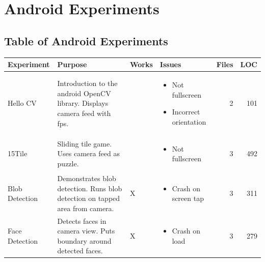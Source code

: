 \appendix




\clearpage
\section{Android Experiments}\label{app:android_experiments}
	\subsection{Table of Android Experiments}
	\begin{table}[h!]
		\centering
		\label{tab:android_experiments}
		\begin{tabular}{|l|p{}|l|p{}|r|r|}
			\hline
			\rowcolor{gray!50}
			\bfseries Experiment&\bfseries Purpose&\bfseries Works&\bfseries Issues&\bfseries Files&\bfseries LOC\\
			\hline
			Hello CV&
			Introduction to the android OpenCV library. Displays camera feed with fps.&
			\checkmark&
			\begin{itemize}[noitemsep,topsep=0pt,parsep=0pt]
				\item{Not fullscreen}
				\item{Incorrect orientation}
			\end{itemize}&
			2&
			101\\
			15Tile&
			Sliding tile game. Uses camera feed as puzzle.&
			\checkmark&
			\begin{itemize}[noitemsep,topsep=0pt,parsep=0pt]
				\item{Not fullscreen}
			\end{itemize}&
			3&
			492\\
			Blob Detection&
			Demonstrates blob detection. Runs blob detection on tapped area from camera.&
			X&
			\begin{itemize}[noitemsep,topsep=0pt,parsep=0pt]
				\item{Crash on screen tap}
			\end{itemize}&
			3&
			311\\
			Face Detection&
			Detects faces in camera view. Puts boundary around detected faces.&
			X&
			\begin{itemize}[noitemsep,topsep=0pt,parsep=0pt]
				\item{Crash on load}
			\end{itemize}&
			3&
			279\\
			\hline
		\end{tabular}
	\end{table}
